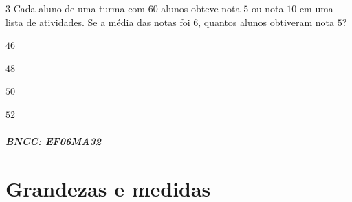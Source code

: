 
\num{3}  Cada aluno de uma turma com $60$ alunos obteve nota $5$ ou nota $10$ em uma
lista de atividades. Se a média das notas foi $6$, quantos alunos
obtiveram nota $5$?

\begin{escolha}
\item $46$
\item $48$
\item $50$
\item $52$
\end{escolha}

\paragraph{BNCC: EF06MA32 }


\chapter{Grandezas e medidas}

